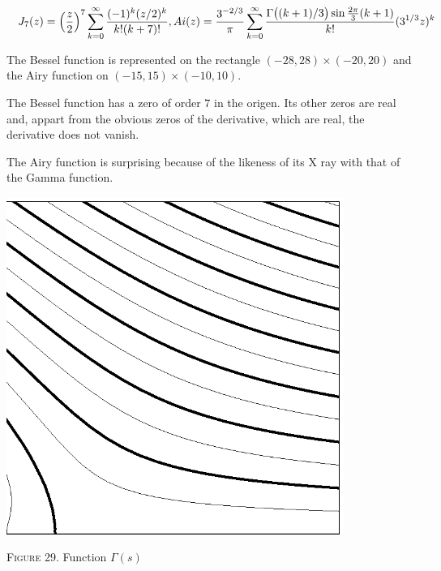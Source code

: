 \documentclass[a4paper]{amsart}
\numberwithin{equation}{section}
\def\sen{\operatorname{\text{sin}}}
\begin{document}
\begin{large}


$$\mskip-20mu J_{7}(z)=\Bigl({z\over2}\Bigr)^7\sum_{k=0}^\infty {(-1)^k 
(z/2)^k\over k! (k+7)!}, Ai(z)={3^{-2/3}\over 
\pi}\sum_{k=0}^\infty{\Gamma\bigl((k+1)/3\bigr)\sen{2\pi\over3}(k+1)\over 
k!}(3^{1/3}z)^k\mskip-70mu$$





\bigskip

The Bessel function is represented on the rectangle
 $(-28, 28)\times (-20, 20)$ and the Airy function on  $(-15, 15)\times (-10,
10)$. 

The Bessel function has a zero of order $7$ in the origen. Its other
zeros are real and, appart from the obvious zeros of the derivative, which are
real, the derivative does not vanish.



The Airy function is surprising because of the likeness of its X ray 
with that of the
Gamma function.










\end{large}
\begin{minipage}{321pt}
\bigskip
\includegraphics[width=312pt]{figure52.ps}
\vfil
\centerline{{\scshape Figure} 29. Function $\Gamma(s)$}
\end{minipage}
\medskip
\end{document}
